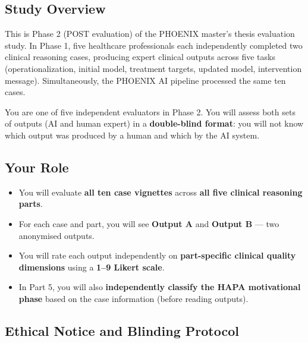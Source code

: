 \documentclass[11pt,a4paper]{article}
\begin{document}
\subsection{Study Overview}

This is Phase 2 (POST evaluation) of the PHOENIX master's thesis evaluation study. In Phase 1, five healthcare professionals each independently completed two clinical reasoning cases, producing expert clinical outputs across five tasks (operationalization, initial model, treatment targets, updated model, intervention message). Simultaneously, the PHOENIX AI pipeline processed the same ten cases.

You are one of five independent evaluators in Phase 2. You will assess both sets of outputs (AI and human expert) in a \textbf{double-blind format}: you will not know which output was produced by a human and which by the AI system.

\subsection{Your Role}

\begin{itemize}
\item You will evaluate \textbf{all ten case vignettes} across \textbf{all five clinical reasoning parts}.
\item For each case and part, you will see \textbf{Output A} and \textbf{Output B} --- two anonymised outputs.
\item You will rate each output independently on \textbf{part-specific clinical quality dimensions} using a \textbf{1--9 Likert scale}.
\item In Part 5, you will also \textbf{independently classify the HAPA motivational phase} based on the case information (before reading outputs).
\end{itemize}

\subsection{Ethical Notice and Blinding Protocol}
\end{document}
